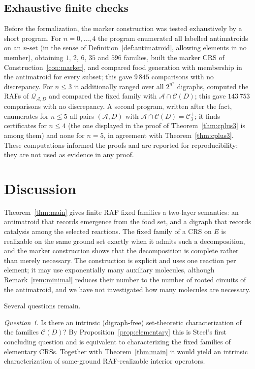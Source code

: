 \documentclass[11pt,a4paper]{article}
\theoremstyle{plain}
\theoremstyle{definition}
\theoremstyle{remark}
\newtheorem{question}[theorem]{Question}
\newcommand{\cA}{\mathcal{A}}
\newcommand{\cC}{\mathcal{C}}
\newcommand{\cQ}{\mathcal{Q}}
\newcommand{\Cplus}[1]{\cC^{+}_{#1}}
\begin{document}
\subsection{Exhaustive finite checks}

Before the formalization, the marker construction was tested exhaustively by a short program. For $n=0,\dots,4$ the program enumerated all labelled antimatroids on an $n$-set (in the sense of Definition~\ref{def:antimatroid}, allowing elements in no member), obtaining $1$, $2$, $6$, $35$ and $596$ families, built the marker CRS of Construction~\ref{con:marker}, and compared food generation with membership in the antimatroid for every subset; this gave $9\,845$ comparisons with no discrepancy. For $n\le3$ it additionally ranged over all $2^{n^2}$ digraphs, computed the RAFs of $\cQ_{\cA,D}$ and compared the fixed family with $\cA\cap\cC(D)$; this gave $143\,753$ comparisons with no discrepancy. A second program, written after the fact, enumerates for $n\le5$ all pairs $(\cA,D)$ with $\cA\cap\cC(D)=\Cplus{3}$; it finds certificates for $n\le4$ (the one displayed in the proof of Theorem~\ref{thm:cplus3} is among them) and none for $n=5$, in agreement with Theorem~\ref{thm:cplus3}. These computations informed the proofs and are reported for reproducibility; they are not used as evidence in any proof.

\section{Discussion}\label{sec:discussion}

Theorem~\ref{thm:main} gives finite RAF fixed families a two-layer semantics: an antimatroid that records emergence from the food set, and a digraph that records catalysis among the selected reactions. The fixed family of a CRS on $E$ is realizable on the same ground set exactly when it admits such a decomposition, and the marker construction shows that the decomposition is complete rather than merely necessary. The construction is explicit and uses one reaction per element; it may use exponentially many auxiliary molecules, although Remark~\ref{rem:minimal} reduces their number to the number of rooted circuits of the antimatroid, and we have not investigated how many molecules are necessary.

Several questions remain.

\begin{question}
Is there an intrinsic (digraph-free) set-theoretic characterization of the families $\cC(D)$? By Proposition~\ref{prop:elementary} this is Steel's first concluding question and is equivalent to characterizing the fixed families of elementary CRSs. Together with Theorem~\ref{thm:main} it would yield an intrinsic characterization of same-ground RAF-realizable interior operators.
\end{question}
\end{document}
